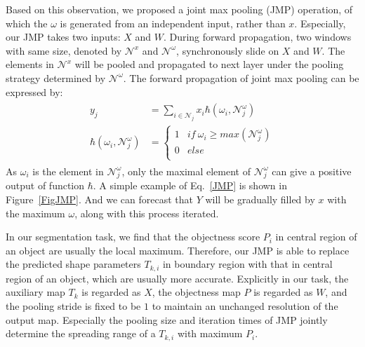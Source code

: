 Based on this observation, we proposed a joint max pooling (JMP) operation, of which the $\omega$ is generated from an independent input, rather than $x$.
Especially, our JMP takes two inputs: $X$ and $W$.
During forward propagation, two windows with same size, denoted by $\mathcal{N}^{x}$ and $\mathcal{N}^{\omega}$, synchronously slide on $X$ and $W$.
The elements in $\mathcal{N}^{x}$ will be pooled and propagated to next layer under the pooling strategy determined by $\mathcal{N}^{\omega}$.
The forward propagation of joint max pooling can be expressed by:
\begin{eqnarray}\label{JMP}
\begin{aligned}
y_{j} &= \sum_{i\in \mathcal{N}_{j}}x_{i}\hbar(\omega_{i},\mathcal{N}^{\omega}_{j})\\
\hbar(\omega_{i},\mathcal{N}^{\omega}_{j})&=\left\{\begin{array}{cc}
1&if~\omega_{i}\geq max(\mathcal{N}^{\omega}_{j})\\
0&else\\
\end{array}\right.
\end{aligned}
\end{eqnarray}
As $\omega_i$ is the element in $\mathcal{N}^{\omega}_{j}$, only the maximal element of $\mathcal{N}^{\omega}_{j}$ can give a positive output of function $\hbar$.
A simple example of Eq.~\ref{JMP} is shown in Figure~\ref{FigJMP}.
And we can forecast that $Y$ will be gradually filled by $x$ with the maximum $\omega$, along with this process iterated.

In our segmentation task, we find that the objectness score $P_i$ in central region of an object are usually the local maximum.
Therefore, our JMP is able to replace the predicted shape parameters $T_{k,i}$ in boundary region with that in central region of an object, which are usually more accurate.
Explicitly in our task, the auxiliary map $T_k$ is regarded as $X$, the objectness map $P$ is regarded as $W$, and the pooling stride is fixed to be $1$ to maintain an unchanged resolution of the output map.
Especially the pooling size and iteration times of JMP jointly determine the spreading range of a $T_{k,i}$ with maximum $P_i$.


